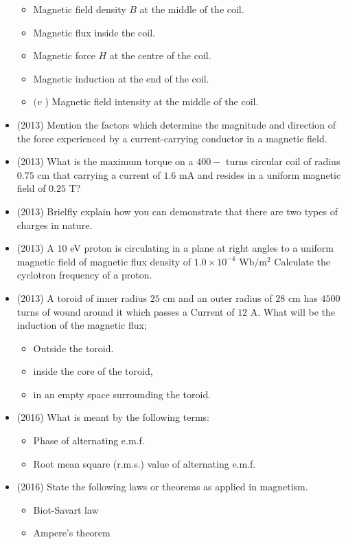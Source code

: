 \documentclass{article}
\begin{document}
\begin{itemize}
 \begin{itemize}
\item Magnetic field density $ B$ at the middle of the coil.
\item Magnetic flux inside the coil. 
\item Magnetic force $ H$ at the centre of the coil. 
\item Magnetic induction at the end of the coil.
\item $ (v$ ) Magnetic field intensity at the middle of the coil. 
\end{itemize}
\item (2013)  Mention the factors which determine the magnitude and direction of the force experienced by a current-carrying conductor in a magnetic field.
\item (2013)  What is the maximum torque on a $ 400-$ turns circular coil of radius $ 0.75$ cm that carrying a current of $ 1.6$ mA and resides in a uniform magnetic field of $ 0.25$ T?
\item (2013)  Brielfly explain how you can demonstrate that there are two types of charges in nature.
\item (2013)  A $ 10$ eV proton is circulating in a plane at right angles to a uniform magnetic field of magnetic flux density of $ 1.0 \times 10^{-4}$ Wb$/$m$ ^{2}$ Calculate the cyclotron frequency of a proton.
\item (2013)  A toroid of inner radius $ 25$ cm and an outer radius of $ 28$ cm has $ 4500$ turns of wound around it which passes a Current of $ 12$ A. What will be the induction of the magnetic flux;
 \begin{itemize}
\item Outside the toroid. 
\item inside the core of the toroid, 
\item in an empty space surrounding the toroid. 
\end{itemize}
\item (2016)  What is meant by the following terms:
 \begin{itemize}
\item  Phase of alternating e.m.f.
\item  Root mean square (r.m.s.) value of alternating e.m.f.
\end{itemize}
\item (2016)  State the following laws or theorems as applied in magnetism.
 \begin{itemize}
\item Biot-Savart law
\item Ampere’s theorem

\end{itemize}
\end{itemize}
\end{document}
